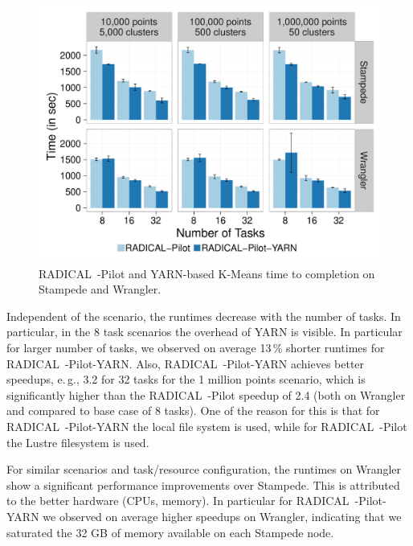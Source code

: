 \begin{figure}[t]
    \centering
    \includegraphics[width=.95\textwidth]{figures/data_analytics_hpc/hpc_hadoop/kmeans.pdf}
    \caption{RADICAL~-Pilot and YARN-based K-Means time to completion on Stampede and Wrangler.}
    \label{fig:experiments_kmeans_rpyarnkmeans}
\end{figure}

Independent of the scenario, the runtimes decrease with the number of tasks.
In particular, in the 8 task scenarios the overhead of YARN is visible.
In particular for larger number of tasks, we observed on average 13\,\% shorter runtimes for RADICAL~-Pilot-YARN.
Also, RADICAL~-Pilot-YARN achieves better speedups, e.\,g., 3.2 for 32 tasks for the 1 million points scenario, which is significantly higher than the RADICAL~-Pilot speedup of 2.4 (both on Wrangler and compared to base case of 8 tasks).
One of the reason for this is that for RADICAL~-Pilot-YARN the local file system is used, while for RADICAL~-Pilot the Lustre filesystem is used.

For similar scenarios and task/resource configuration, the runtimes on Wrangler show a significant performance improvements over Stampede.
This is attributed to the better hardware (CPUs, memory).
In particular for RADICAL~-Pilot-YARN we observed on average higher speedups on Wrangler, indicating that we saturated the 32 GB of memory available on each Stampede node.

